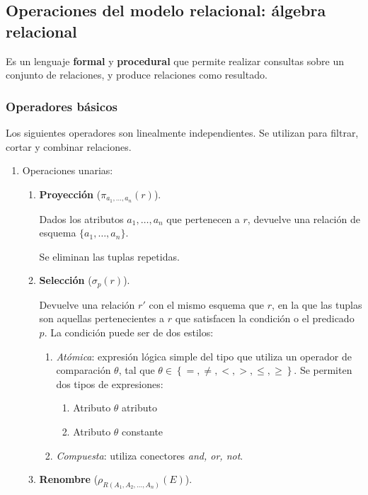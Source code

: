 \documentclass[a4paper, twoside]{article}
\begin{document}
\subsection{Operaciones del modelo relacional: álgebra relacional}
Es un lenguaje\textbf{ formal }y \textbf{procedural }que\textbf{ }permite realizar consultas sobre un conjunto de relaciones, y produce relaciones como resultado.

\subsubsection{Operadores básicos}
Los siguientes operadores son linealmente independientes. Se utilizan para filtrar,\emph{ }cortar y combinar relaciones.

\begin{enumerate}
	\item Operaciones unarias:
	\begin{enumerate}
		\item \textbf{Proyección} ($\pi_{a_{1},\dots,a_{n}}(r)$). 

		Dados los atributos $a_{1},\dots,a_{n}$ que pertenecen a $r$, devuelve una relación de esquema $\{a_{1},\dots,a_{n}\}$.

		Se eliminan las tuplas repetidas.

		\item \textbf{Selección} ($\sigma_{p}(r)$). 

		Devuelve una relación $r'$ con el mismo esquema que $r$, en la que las tuplas son aquellas pertenecientes a $r$ que satisfacen la condición o el predicado $p$. La condición puede ser de dos estilos:
		\begin{enumerate}
			\item \emph{Atómica}: expresión lógica simple del tipo que utiliza un operador de comparación $\theta$, tal que $\theta\in\left\{ =,\neq,<,>,\leq,\geq\right\} $. Se permiten dos tipos de expresiones:
			\begin{enumerate}
				\item Atributo $\theta$ atributo
				\item Atributo $\theta$ constante
			\end{enumerate}

			\item \emph{Compuesta}: utiliza conectores \emph{and, or, not}.
		\end{enumerate}

		\item \textbf{Renombre} ($\rho_{R(A_{1},A_{2},\dots,A_{n})}(E)$). 


\end{enumerate}
\end{enumerate}
\end{document}
